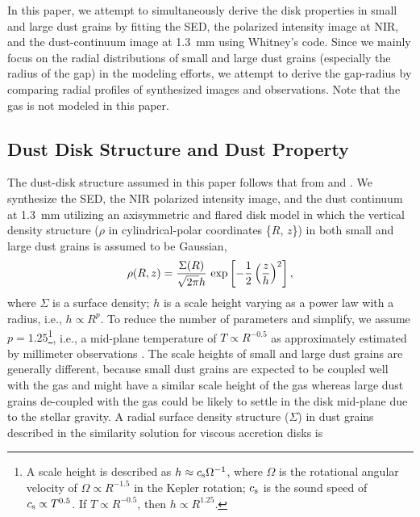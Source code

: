 \documentclass[apj]{emulateapj-rtx4}
\begin{document}
  In this paper, we attempt to simultaneously derive the disk properties in small and large dust grains 
  by fitting the SED, the polarized intensity image at NIR, and the dust-continuum image at 1.3~mm using Whitney's code.
  Since we mainly focus on the radial distributions of small and large dust grains (especially the radius of the gap)
  in the modeling efforts, 
  we attempt to derive the gap-radius by comparing radial profiles of synthesized images and observations.
  Note that the gas is not modeled in this paper.

  \subsection{Dust Disk Structure and Dust Property}\label{sec:struct}

  The dust-disk structure assumed in this paper follows that from  \citet{hash12} and \citet{dong12b}.
  We synthesize the SED, the NIR polarized intensity image, and the dust continuum at 1.3~mm utilizing 
  an axisymmetric and flared disk model in which the vertical density structure ($\rho$ in cylindrical-polar 
  coordinates \{$R$, $z$\}) in both small and large dust grains is assumed to be Gaussian,
  \begin{eqnarray}
     \rho(R,z) = \frac{\Sigma(R)}{\sqrt{2\pi}h} \ {\rm exp}\left[-\frac{1}{2}\left(\frac{z}{h}\right)^{2}\right],
     \label{eq_dens}
  \end{eqnarray}
  where $\Sigma$ is a surface density; $h$ is a scale height varying as a power law with a radius, i.e., $h \propto R^{p}$. 
  To reduce the number of parameters and simplify, we assume $p=1.25$\footnote{A scale height is described as 
    $h \approx c_{\rm s} \Omega^{-1}$, where $\Omega$ is the rotational angular velocity of $\Omega \propto R^{-1.5}$ in the Kepler 
    rotation; $c_{\rm s}$ is the sound speed of $c_{\rm s} \propto T^{0.5}$. If $T \propto R^{-0.5}$, then $h \propto R^{1.25}$.}, 
  i.e., a mid-plane temperature of $T \propto R^{-0.5}$ as approximately estimated by millimeter observations \citep{beck90}.
  The scale heights of small and large dust grains are generally different, 
  because small dust grains are expected to be coupled well
  with the gas and might have a similar scale height of the gas whereas large dust grains de-coupled with the gas
  could be likely to settle in the disk mid-plane due to the stellar gravity.
  A radial surface density structure ($\Sigma$) in dust grains described in the similarity solution for viscous accretion
  disks \citep{lynd74,hart98} is
\end{document}
